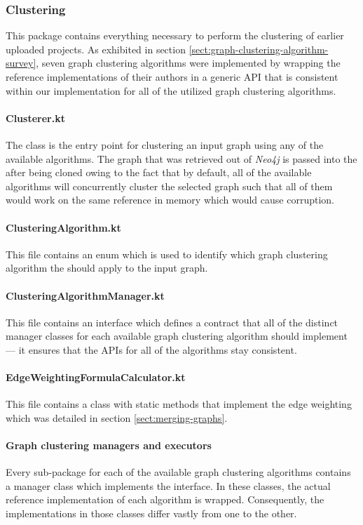\documentclass[12pt,a4paper]{report}
\begin{document}
\subsubsection{Clustering}
This package contains everything necessary to perform the clustering of
earlier uploaded projects. As exhibited in section \ref{sect:graph-clustering-algorithm-survey},
seven graph clustering algorithms were implemented by wrapping the
reference implementations of their authors in a generic API that is consistent
within our implementation for all of the utilized graph clustering algorithms.

\paragraph{Clusterer.kt}
The  class is the entry point for clustering an input graph
using any of the available algorithms. The graph that was retrieved out of
\textit{Neo4j} is passed into the  after being cloned owing
to the fact that by default, all of the available algorithms will concurrently
cluster the selected graph such that all of them would work on the same
reference in memory which would cause corruption.

\paragraph{ClusteringAlgorithm.kt}
This file contains an enum which is used to identify which graph clustering
algorithm the  should apply to the input graph.

\paragraph{ClusteringAlgorithmManager.kt}
This file contains an interface which defines a contract that all of the
distinct manager classes for each available graph clustering algorithm
should implement --- it ensures that the APIs for all of the algorithms stay consistent.

\paragraph{EdgeWeightingFormulaCalculator.kt}
This file contains a class with static methods that implement the edge weighting
which was detailed in section \ref{sect:merging-graphs}.

\paragraph{Graph clustering managers and executors}
Every sub-package for each of the available graph clustering algorithms contains
a manager class which implements the  interface.
In these classes, the actual reference implementation of each algorithm is wrapped.
Consequently, the implementations in those classes differ vastly from one to the other.
\end{document}
